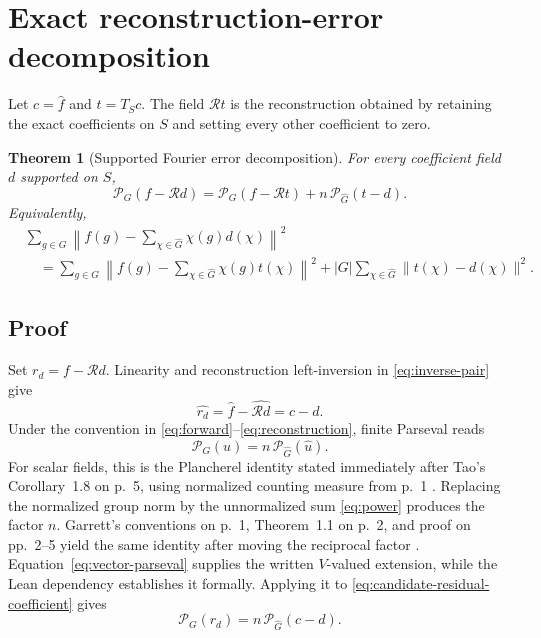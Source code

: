 \documentclass[11pt]{article}
\newtheorem{theorem}{Theorem}
\begin{document}
\section{Exact reconstruction-error decomposition}
Let $c=\widehat f$ and $t=T_Sc$.  The field $\mathcal R t$ is the reconstruction obtained by
retaining the exact coefficients on $S$ and setting every other coefficient to zero.

\begin{theorem}[Supported Fourier error decomposition]
For every coefficient field $d$ supported on $S$,
\begin{equation}
  \boxed{
  \mathcal P_G(f-\mathcal R d)
  =\mathcal P_G(f-\mathcal R t)
   +n\,\mathcal P_{\widehat G}(t-d).}
  \label{eq:main-decomposition}
\end{equation}
Equivalently,
\begin{align*}
 &\sum_{g\in G}
   \left\|f(g)-\sum_{\chi\in\widehat G}\chi(g)d(\chi)\right\|^2\\
 &\quad=
   \sum_{g\in G}
   \left\|f(g)-\sum_{\chi\in\widehat G}\chi(g)t(\chi)\right\|^2
   +|G|\sum_{\chi\in\widehat G}\|t(\chi)-d(\chi)\|^2.
\end{align*}
\end{theorem}

\subsection{Proof}
Set $r_d=f-\mathcal R d$.  Linearity and reconstruction left-inversion in
\eqref{eq:inverse-pair} give
\begin{equation}
  \widehat{r_d}
  =\widehat f-\widehat{\mathcal R d}
  =c-d.
  \label{eq:candidate-residual-coefficient}
\end{equation}
Under the convention in \eqref{eq:forward}--\eqref{eq:reconstruction}, finite Parseval reads
\begin{equation}
  \mathcal P_G(u)=n\,\mathcal P_{\widehat G}(\widehat u).
  \label{eq:parseval}
\end{equation}
For scalar fields, this is the Plancherel identity stated immediately after Tao's
Corollary~1.8 on p.~5, using normalized counting measure from p.~1
\cite{Tao2007FiniteAbelian}.  Replacing the normalized group norm by the unnormalized sum
\eqref{eq:power} produces the factor $n$.  Garrett's conventions on p.~1, Theorem~1.1 on p.~2,
and proof on pp.~2--5 yield the same identity after moving the reciprocal factor
\cite{Garrett2019FiniteAbelian}.  Equation~\eqref{eq:vector-parseval} supplies the written
$V$-valued extension, while the Lean dependency establishes it formally.  Applying it to
\eqref{eq:candidate-residual-coefficient} gives
\begin{equation}
  \mathcal P_G(r_d)=n\,\mathcal P_{\widehat G}(c-d).
  \label{eq:candidate-parseval}
\end{equation}
\end{document}
